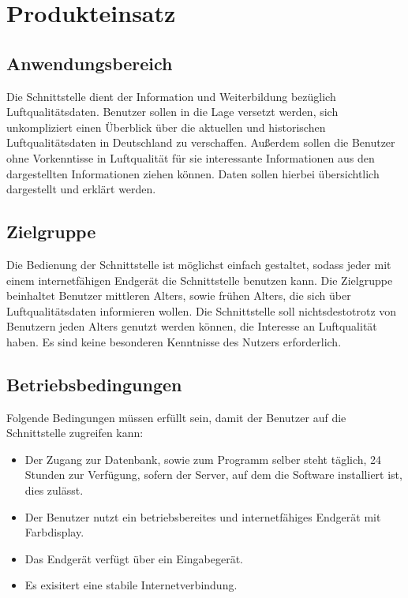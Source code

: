 \section{Produkteinsatz}
\subsection{Anwendungsbereich}
\item Die Schnittstelle dient der Information und Weiterbildung bezüglich \gls{Luftqualitätsdaten}. 
Benutzer sollen in die Lage versetzt werden, sich unkompliziert
einen Überblick über die aktuellen und historischen \gls{Luftqualitätsdaten} in Deutschland zu verschaffen.
Außerdem sollen die Benutzer ohne Vorkenntisse in Luftqualität für sie interessante Informationen aus den dargestellten
Informationen ziehen können. Daten sollen hierbei übersichtlich dargestellt und erklärt werden.
\subsection{Zielgruppe}
\item Die Bedienung der Schnittstelle ist möglichst einfach gestaltet, sodass jeder mit einem internetfähigen \Gls{Endgerät} die Schnittstelle benutzen kann.
Die Zielgruppe beinhaltet Benutzer mittleren Alters, sowie frühen Alters, die sich über \gls{Luftqualitätsdaten} informieren wollen. 
Die Schnittstelle soll nichtsdestotrotz von Benutzern jeden Alters genutzt werden können, die Interesse an Luftqualität haben.
Es sind keine besonderen Kenntnisse des Nutzers erforderlich.
\subsection{Betriebsbedingungen}
\item Folgende Bedingungen müssen erfüllt sein, damit der Benutzer auf die Schnittstelle zugreifen kann:
\begin{itemize}
    \item Der Zugang zur Datenbank, sowie zum Programm selber steht täglich,
    24 Stunden zur Verfügung, sofern der Server, auf dem die Software installiert ist,
    dies zulässt.
    \item Der Benutzer nutzt ein betriebsbereites und internetfähiges \gls{Endgerät} mit Farbdisplay.
    \item Das Endgerät verfügt über ein Eingabegerät.
    \item Es exisitert eine stabile Internetverbindung.
\end{itemize}